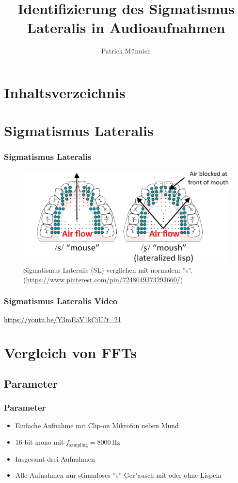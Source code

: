 \documentclass[11pt]{beamer}
\author{Patrick M\"unnich}
\title{Identifizierung des Sigmatismus Lateralis in Audioaufnahmen}
\institute{Hochschule D\"usseldorf}
\begin{document}

\section{Inhaltsverzeichnis}

\begin{frame}
\tableofcontents
\end{frame}

\section{Sigmatismus Lateralis}

\begin{frame}
\frametitle{Sigmatismus Lateralis}
\begin{figure}
\includegraphics[scale=0.4]{lateral_lisp.png}
\caption{Sigmatismus Lateralis (SL) verglichen mit normalem ''s''. (\url{https://www.pinterest.com/pin/7248049373293660/})}
\end{figure}
\end{frame}

\begin{frame}
\frametitle{Sigmatismus Lateralis Video}
\centering
\url{https://youtu.be/Y3mEaV1kCiU?t=21}
\end{frame}

\section{Vergleich von FFTs}

\subsection{Parameter}

\begin{frame}
\frametitle{Parameter}
\begin{itemize}
\item Einfache Aufnahme mit Clip-on Mikrofon neben Mund
\item 16-bit mono mit $f_\mathrm{sampling}=8000$\,Hz
\item Insgesamt drei Aufnahmen
\item Alle Aufnahmen nur stimmloses ''s'' Ger"ausch mit oder ohne Lispeln
\end{itemize}
\end{frame}
\end{document}
